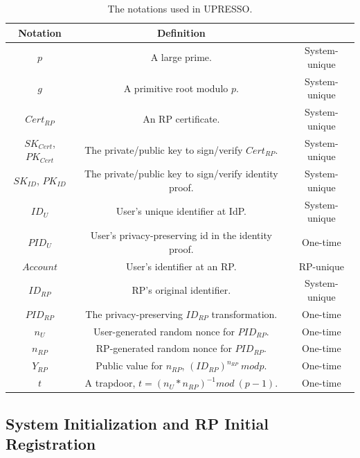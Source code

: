 \begin{table}[tb]
    \caption{The notations used in UPRESSO.}
    \centering
    \begin{tabular}{|c|c|c|}
    \hline
    {Notation} & {Definition} & {} \\
    \hline
    {$p$} & {A large prime.} & {System-unique} \\
    \hline
    {$g$} & {A primitive root  modulo $p$. } & {System-unique} \\
    \hline
    {$Cert_{RP}$} & {An RP certificate. } & {System-unique} \\
    \hline
    {$SK_{Cert}$, $PK_{Cert}$} & {The private/public key to sign/verify $Cert_{RP}$. } & {System-unique} \\
    \hline
    {$SK_{ID}$, $PK_{ID}$} & {The private/public key to sign/verify identity proof.} & {System-unique} \\
    \hline
    {$ID_U$} & {User's unique identifier at IdP.} & {System-unique} \\
    \hline
    {$PID_U$} & {User's privacy-preserving id in the identity proof.} & {One-time}\\
    \hline
    {$Account$} & {User's identifier at an RP.} & {RP-unique} \\
    \hline
    {$ID_{RP}$} & {RP's original identifier.} & {System-unique} \\
    \hline
    {$PID_{RP}$} & {The privacy-preserving $ID_{RP}$ transformation.} & {One-time} \\
    \hline
    {$n_U$} & {User-generated random nonce for $PID_{RP}$.} & {One-time} \\
    \hline
    {$n_{RP}$} & {RP-generated random nonce for $PID_{RP}$.} & {One-time} \\
    \hline
    {$Y_{RP}$} & {Public value for $n_{RP}$, $(ID_{RP})^{n_{RP}} \ mod p$.} & {One-time} \\
    \hline
    {$t$} & {A trapdoor, $t=(n_U*n_{RP})^{-1} mod \ (p-1)$.} & {One-time} \\
    \hline
    \end{tabular}
    \label{tbl:notations}
\end{table}

\subsection{System Initialization and RP Initial Registration}

